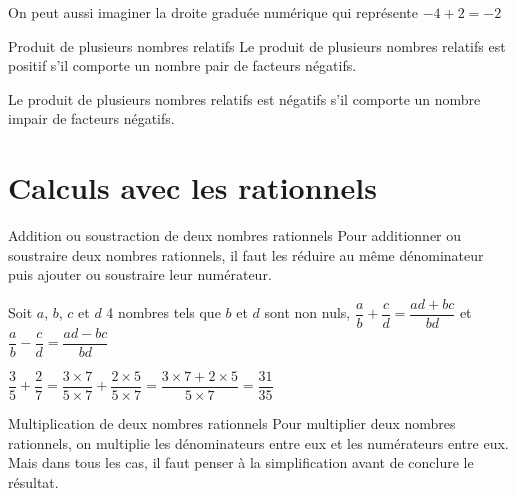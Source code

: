 \begin{pageCours}
\begin{minipage}{0.5\linewidth}
\begin{Rq}
 
On peut aussi imaginer la droite graduée numérique qui représente $-4+2=-2$
 


\end{Rq}


\begin{ThT}{Produit de plusieurs nombres relatifs}
Le produit de plusieurs nombres relatifs est positif s'il comporte un nombre pair de facteurs négatifs.

Le produit de plusieurs nombres relatifs est négatifs s'il comporte un nombre impair de facteurs négatifs.
\end{ThT}
\end{minipage}

\section{Calculs avec les rationnels}

\begin{minipage}[t]{0.5\linewidth}
\begin{DefT}{Addition ou soustraction de deux nombres rationnels}
Pour additionner ou soustraire deux nombres rationnels, il faut les réduire au même dénominateur puis ajouter ou soustraire leur numérateur.


Soit $a$, $b$, $c$ et $d$ 4 nombres tels que $b$ et $d$ sont non nuls, $\dfrac{a}{b}+\dfrac{c}{d} = \dfrac{ad+bc}{bd}$ et $\dfrac{a}{b}-\dfrac{c}{d} = \dfrac{ad-bc}{bd}$
\end{DefT}

\begin{Ex}
 $\dfrac{3}{5}+\dfrac{2}{7} = \dfrac{3 \times 7 }{5 \times 7} + \dfrac{2 \times 5 }{5 \times 7} = \dfrac{3 \times 7+2 \times 5 }{5 \times 7} = \dfrac{31 }{35}$ 
\end{Ex}
\end{minipage}
\begin{minipage}[t]{0.5\linewidth}
\begin{DefT}{Multiplication de deux nombres rationnels}
Pour multiplier deux nombres rationnels, on multiplie les dénominateurs entre eux et les numérateurs entre eux. Mais dans tous les cas, il faut penser à la simplification avant de conclure le résultat.


\end{DefT}
\end{minipage}
\end{pageCours}
